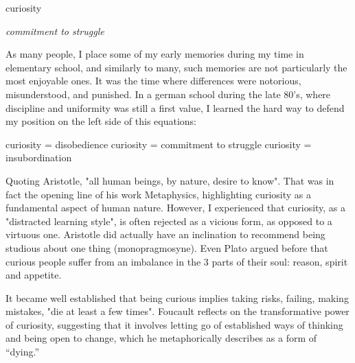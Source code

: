 


\begin{center}
\vspace*{\fill}
\Huge curiosity

\vspace{2cm}

\begin{flushright}
\large
\textit{commitment to struggle}
\end{flushright}

\vspace*{\fill}
\end{center}

\normalsize

As many people, I place some of my early memories during my time in elementary school, and similarly to many, such memories are not particularly the most enjoyable ones. It was the time where differences were notorious, misunderstood, and punished. In a german school during the late 80's, where discipline and uniformity was still a first value, I learned the hard way to defend my position on the left side of this equations: 

curiosity = disobedience
curiosity = commitment to struggle %
curiosity = insubordination

Quoting Aristotle, "all human beings, by nature, desire to know". That was in fact the opening line of his work Metaphysics, highlighting curiosity as a fundamental aspect of human nature.  However, I experienced that curiosity, as a "distracted learning style", is often rejected as a vicious form, as opposed to a virtuous one. Aristotle did actually have an inclination to recommend being studious about one thing (monopragmosyne). Even Plato argued before that curious people suffer from an imbalance in the 3 parts of their soul: reason, spirit and appetite. \citep{perry}

It became well established that being curious implies taking risks, failing, making mistakes, "die at least a few times". \citep{foucault1980masked} Foucault reflects on the transformative power of curiosity, suggesting that it involves letting go of established ways of thinking and being open to change, which he metaphorically describes as a form of “dying.”



